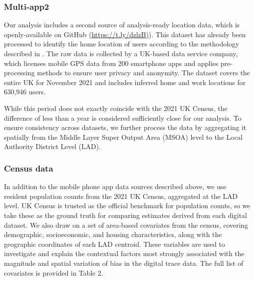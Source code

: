 \documentclass[]{rsos}%
\begin{document}
\subsubsection{Multi-app2}\label{multi-app2}

Our analysis includes a second source of analysis-ready location data,
which is openly-available on GitHub
(\href{https://t.ly/dzlzB}{https://t.ly/dzlzB)}). This dataset has already
been processed to identify the home location of users according to the
methodology described in \citep{zhong24working}. The raw data is collected by
a UK-based data service company, which licenses mobile GPS data from 200
smartphone apps and applies pre-processing methods to ensure user
privacy and anonymity. The dataset covers the entire UK for November
2021 and includes inferred home and work locations for 630,946 users.

While this period does not exactly coincide with the 2021 UK Census, the
difference of less than a year is considered sufficiently close for our
analysis. To ensure consistency across datasets, we further process the
data by aggregating it spatially from the Middle Layer Super Output Area
(MSOA) level to the Local Authority District Level (LAD).

\subsubsection{Census data}\label{census-data}

In addition to the mobile phone app data sources described above, we use
resident population counts from the 2021 UK Census, aggregated at the
LAD level. UK Census is trusted as the official benchmark for population
counts, so we take these as the ground truth for comparing estimates
derived from each digital dataset. We also draw on a set of area-based
covariates from the census, covering demographic, socioeconomic, and
housing characteristics, along with the geographic coordinates of each
LAD centroid. These variables are used to investigate and explain the
contextual factors most strongly associated with the magnitude and
spatial variation of bias in the digital trace data. The full list of
covariates is provided in Table 2.
\end{document}
